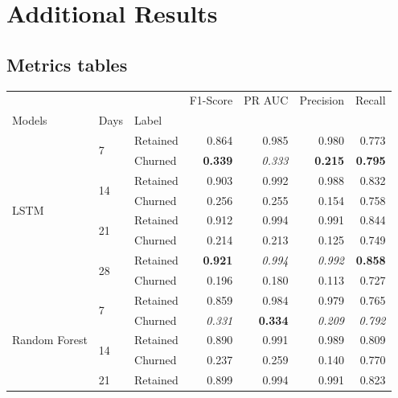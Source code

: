 \documentclass{kththesis}
\begin{document}


\appendix

\chapter{Additional Results}
\label{cha:add_results}

\section{Metrics tables}


\begin{table}[h]
\centering
\begin{tabular}{lllrrrr}
\toprule
     &   &          &  F1-Score &    PR AUC &  Precision &    Recall \\
Models & Days & Label &           &           &            &           \\
\midrule
\multirow{8}{*}{LSTM} & \multirow{2}{*}{7} & Retained &  0.864 &  0.985 &   0.980 &  0.773 \\
     &   & Churned &  \textbf{0.339} &  \textit{0.333} &   \textbf{0.215} &  \textbf{0.795} \\
\cline{2-7}
     & \multirow{2}{*}{14} & Retained &  0.903 &  0.992 &   0.988 &  0.832 \\
     &   & Churned &  0.256 &  0.255 &   0.154 &  0.758 \\
\cline{2-7}
     & \multirow{2}{*}{21} & Retained &  0.912 &  0.994 &   0.991 &  0.844 \\
     &   & Churned &  0.214 &  0.213 &   0.125 &  0.749 \\
\cline{2-7}
     & \multirow{2}{*}{28} & Retained &  \textbf{0.921} &  \textit{0.994} &   \textit{0.992} &  \textbf{0.858} \\
     &   & Churned &  0.196 &  0.180 &   0.113 &  0.727 \\
\cline{1-7}
\cline{2-7}
\multirow{8}{*}{Random Forest} & \multirow{2}{*}{7} & Retained &  0.859 &  0.984 &   0.979 &  0.765 \\
     &   & Churned &  \textit{0.331} &  \textbf{0.334} &   \textit{0.209} &  \textit{0.792} \\
\cline{2-7}
     & \multirow{2}{*}{14} & Retained &  0.890 &  0.991 &   0.989 &  0.809 \\
     &   & Churned &  0.237 &  0.259 &   0.140 &  0.770 \\
\cline{2-7}
     & \multirow{2}{*}{21} & Retained &  0.899 &  0.994 &   0.991 &  0.823 \\

\end{tabular}
\end{table}
\end{document}
